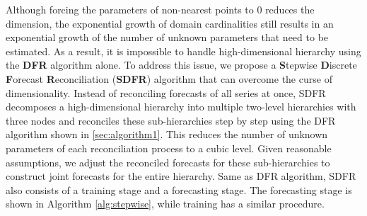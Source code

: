 \documentclass[a4paper,review,12pt,authoryear]{elsarticle}
\begin{document}
    Although forcing the parameters of non-nearest points to $0$ reduces the dimension, the exponential growth of domain cardinalities  still results in an exponential growth of  the number of unknown parameters that need to be estimated.
    As a result, it is impossible to handle high-dimensional hierarchy using the \textbf{DFR} algorithm alone.
    To address this issue, we propose a \textbf{S}tepwise \textbf{D}iscrete \textbf{F}orecast \textbf{R}econciliation (\textbf{SDFR}) algorithm that can overcome the curse of dimensionality.
    Instead of reconciling forecasts of all series at once,  SDFR
    decomposes a high-dimensional hierarchy into multiple two-level hierarchies with three nodes and reconciles these sub-hierarchies step by step using the DFR algorithm shown in \ref{sec:algorithm1}.
    This reduces the number of unknown parameters of each reconciliation process to a cubic level.
    Given reasonable assumptions, we adjust the reconciled forecasts for these sub-hierarchies to construct joint forecasts for the entire hierarchy.
    Same as DFR algorithm, SDFR also consists of a training stage and a forecasting stage. The forecasting stage is shown in Algorithm \ref{alg:stepwise}, while training has a similar procedure.
\end{document}
